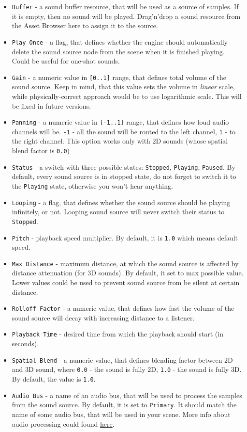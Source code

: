 \documentclass[
]{book}
\providecommand{\tightlist}{%
  \setlength{\itemsep}{0pt}\setlength{\parskip}{0pt}}
\theoremstyle{definition}
\theoremstyle{definition}
\theoremstyle{definition}
\theoremstyle{definition}
\theoremstyle{remark}
\begin{document}
\begin{itemize}
\tightlist
\item
  \texttt{Buffer} - a sound buffer resource, that will be used as a source of samples. If it is empty, then no sound will be
  played. Drag'n'drop a sound resource from the Asset Browser here to assign it to the source.
\item
  \texttt{Play\ Once} - a flag, that defines whether the engine should automatically delete the sound source node from the scene when it is finished playing. Could be useful for one-shot sounds.
\item
  \texttt{Gain} - a numeric value in \texttt{{[}0..1{]}} range, that defines total volume of the sound source. Keep in mind, that this value sets the volume in \emph{linear} scale, while physically-correct approach would be to use logarithmic scale. This will be fixed in future versions.
\item
  \texttt{Panning} - a numeric value in \texttt{{[}-1..1{]}} range, that defines how loud audio channels will be. \texttt{-1} - all the sound will be routed to the left channel, \texttt{1} - to the right channel. This option works only with 2D sounds (whose spatial blend factor is \texttt{0.0})
\item
  \texttt{Status} - a switch with three possible states: \texttt{Stopped}, \texttt{Playing}, \texttt{Paused}. By default, every sound source is in stopped state, do not forget to switch it to the \texttt{Playing} state, otherwise you won't hear anything.
\item
  \texttt{Looping} - a flag, that defines whether the sound source should be playing infinitely, or not. Looping sound source will never switch their status to \texttt{Stopped}.
\item
  \texttt{Pitch} - playback speed multiplier. By default, it is \texttt{1.0} which means default speed.\\
\item
  \texttt{Max\ Distance} - maximum distance, at which the sound source is affected by distance attenuation (for 3D sounds). By default, it set to max possible value. Lower values could be used to prevent sound source from be silent at certain distance.
\item
  \texttt{Rolloff\ Factor} - a numeric value, that defines how fast the volume of the sound source will decay with increasing distance to a listener.
\item
  \texttt{Playback\ Time} - desired time from which the playback should start (in seconds).
\item
  \texttt{Spatial\ Blend} - a numeric value, that defines blending factor between 2D and 3D sound, where \texttt{0.0} - the sound is fully 2D, \texttt{1.0} - the sound is fully 3D. By default, the value is \texttt{1.0}.
\item
  \texttt{Audio\ Bus} - a name of an audio bus, that will be used to process the samples from the sound source. By default, it is set to \texttt{Primary}. It should match the name of some audio bus, that will be used in your scene. More info about audio processing could found \href{bus.md}{here}.
\end{itemize}
\end{document}
